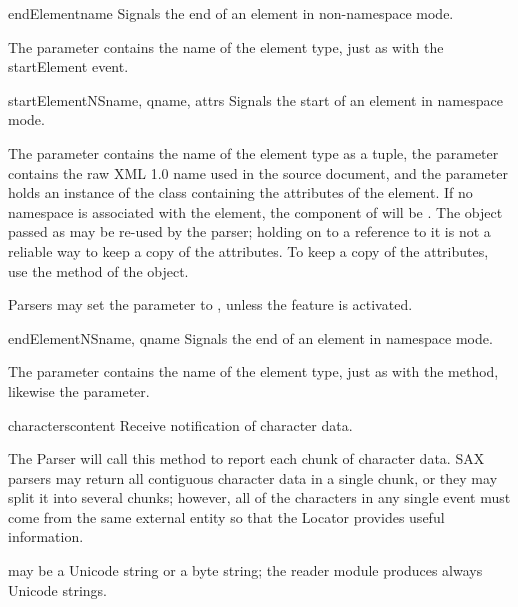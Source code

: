 \begin{methoddesc}[ContentHandler]{endElement}{name}
  Signals the end of an element in non-namespace mode.

  The  parameter contains the name of the element type, just
  as with the startElement event.
\end{methoddesc}

\begin{methoddesc}[ContentHandler]{startElementNS}{name, qname, attrs}
  Signals the start of an element in namespace mode.

  The  parameter contains the name of the element type as a
   tuple, the  parameter
  contains the raw XML 1.0 name used in the source document, and the
   parameter holds an instance of the 
  class containing the attributes of the element.  If no namespace is
  associated with the element, the  component of 
  will be .  The object passed as  may be
  re-used by the parser; holding on to a reference to it is not a
  reliable way to keep a copy of the attributes.  To keep a copy of
  the attributes, use the  method of the 
  object.

  Parsers may set the  parameter to , unless the
   feature is activated.
\end{methoddesc}

\begin{methoddesc}[ContentHandler]{endElementNS}{name, qname}
  Signals the end of an element in namespace mode.

  The  parameter contains the name of the element type, just
  as with the  method, likewise the
   parameter.
\end{methoddesc}

\begin{methoddesc}[ContentHandler]{characters}{content}
  Receive notification of character data.
        
  The Parser will call this method to report each chunk of character
  data. SAX parsers may return all contiguous character data in a
  single chunk, or they may split it into several chunks; however, all
  of the characters in any single event must come from the same
  external entity so that the Locator provides useful information.

   may be a Unicode string or a byte string; the
   reader module produces always Unicode strings.

\end{methoddesc}

